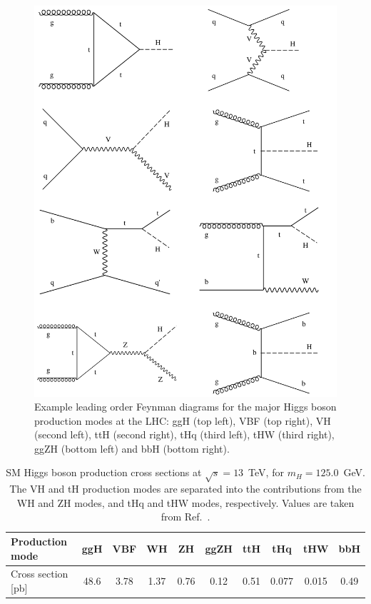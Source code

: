 \begin{figure}[htb!]
  \centering
  \includegraphics[width=.8\linewidth]{Figures/theory/production_feynman.png}
  \caption[Leading order Feynman diagrams for the major Higgs boson production modes]
  {
    Example leading order Feynman diagrams for the major Higgs boson production modes at the LHC: ggH (top left), VBF (top right), VH (second left), ttH (second right), tHq (third left), tHW (third right), ggZH (bottom left) and bbH (bottom right).
  }
  \label{fig:higgs_production_feynman}
\end{figure}

\begin{table}[htb]
    \caption[Higgs boson production cross sections]{SM Higgs boson production cross sections at $\sqrt{s}=13$~TeV, for $m_H=125.0$~GeV. The VH and tH production modes are separated into the contributions from the WH and ZH modes, and tHq and tHW modes, respectively. Values are taken from Ref.~\cite{deFlorian:2016spz}.}
    \label{tab:higgs_xs}
    \centering
    \footnotesize
    \setlength{\tabcolsep}{8pt}
    \renewcommand{\arraystretch}{2}
    \begin{tabular}{l|c|c|c|c|c|c|c|c|c}
        Production mode & ggH & VBF & WH & ZH & ggZH & ttH & tHq & tHW & bbH   \\ \hline
        Cross section [pb] & 48.6 & 3.78 & 1.37 & 0.76 & 0.12 & 0.51 & 0.077 & 0.015 & 0.49 \\
    \end{tabular}
\end{table}

